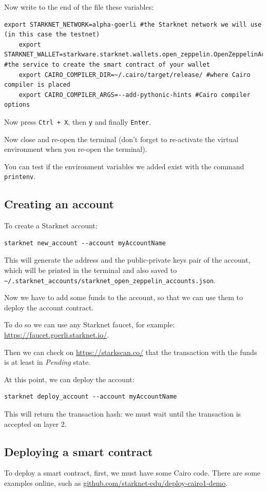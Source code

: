 \documentclass[11pt]{article}
\begin{document}
Now write to the end of the file these variables:
\begin{lstlisting}[language=terminal]
    export STARKNET_NETWORK=alpha-goerli #the Starknet network we will use (in this case the testnet)
    export STARKNET_WALLET=starkware.starknet.wallets.open_zeppelin.OpenZeppelinAccount #the service to create the smart contract of your wallet
    export CAIRO_COMPILER_DIR=~/.cairo/target/release/ #where Cairo compiler is placed
    export CAIRO_COMPILER_ARGS=--add-pythonic-hints #Cairo compiler options
\end{lstlisting}

Now press \verb|Ctrl + X|, then \verb|y| and finally \verb|Enter|.

Now close and re-open the terminal (don't forget to re-activate the virtual environment when you re-open the terminal).

You can test if the environment variables we added exist with the command \verb|printenv|.

\subsection{Creating an account}
To create a Starknet account:
\begin{lstlisting}[language=terminal]
    starknet new_account --account myAccountName
\end{lstlisting}

This will generate the address and the public-private keys pair of the account, which will be printed in the terminal and also saved to \verb|~/.starknet_accounts/starknet_open_zeppelin_accounts.json|.

Now we have to add some funds to the account, so that we can use them to deploy the account contract.

To do so we can use any Starknet faucet, for example: \url{https://faucet.goerli.starknet.io/}.

Then we can check on \url{https://starkscan.co/} that the transaction with the funds is at least in \emph{Pending} state.

At this point, we can deploy the account:
\begin{lstlisting}[language=terminal]
    starknet deploy_account --account myAccountName
\end{lstlisting}

This will return the transaction hash: we must wait until the transaction is accepted on layer 2.

\subsection{Deploying a smart contract}
To deploy a smart contract, first, we must have some Cairo code. There are some examples online, such as \url{github.com/starknet-edu/deploy-cairo1-demo}.
\end{document}
